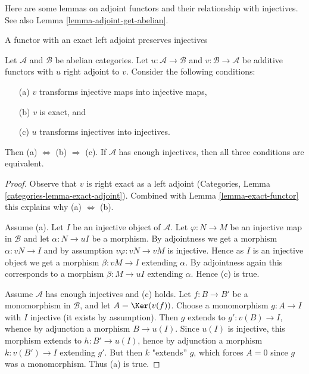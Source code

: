 \noindent
Here are some lemmas on adjoint functors and their relationship with
injectives. See also Lemma \ref{lemma-adjoint-get-abelian}.

\begin{lemma}
\label{lemma-adjoint-preserve-injectives}
\begin{slogan}
A functor with an exact left adjoint preserves injectives
\end{slogan}
Let $\mathcal{A}$ and $\mathcal{B}$ be abelian categories.
Let $u : \mathcal{A} \to \mathcal{B}$ and
$v : \mathcal{B} \to \mathcal{A}$ be additive functors with
$u$ right adjoint to $v$. Consider the following conditions:
\begin{enumerate}
\item[(a)] $v$ transforms injective maps into injective maps,
\item[(b)] $v$ is exact, and
\item[(c)] $u$ transforms injectives into injectives.
\end{enumerate}
Then (a) $\Leftrightarrow$ (b) $\Rightarrow$ (c). If $\mathcal{A}$
has enough injectives, then all three conditions are equivalent.
\end{lemma}

\begin{proof}
Observe that $v$ is right exact as a left adjoint (Categories, Lemma
\ref{categories-lemma-exact-adjoint}). Combined with
Lemma \ref{lemma-exact-functor} this explains why (a) $\Leftrightarrow$ (b).

\medskip\noindent
Assume (a). Let $I$ be an injective object of $\mathcal{A}$.
Let $\varphi : N \to M$ be an injective map in $\mathcal{B}$ and let
$\alpha : N \to uI$ be a morphism.
By adjointness we get a morphism $\alpha : vN \to I$ and
by assumption $v\varphi : vN \to vM$ is injective.
Hence as $I$ is an injective object we get a morphism
$\beta : vM \to I$ extending $\alpha$. By adjointness
again this corresponds to a morphism $\beta : M \to uI$ extending $\alpha$.
Hence (c) is true.

\medskip\noindent
Assume $\mathcal{A}$ has enough injectives and (c) holds.
Let  $f : B \to B'$ be a monomorphism in $\mathcal{B}$, and let
$A = \Ker(v(f))$. Choose a monomorphism $g : A \to I$ with $I$ injective
(it exists by assumption). Then $g$ extends to $g' : v(B) \to I$,
whence by adjunction a morphism $B \to u(I)$. Since $u(I)$ is injective,
this morphism extends to $h : B' \to u(I)$, hence by adjunction a morphism
$k : v(B') \to I$ extending $g'$. But then $k$ "extends'' $g$,
which forces $A = 0$ since $g$ was a monomorphism. Thus (a) is true.
\end{proof}

